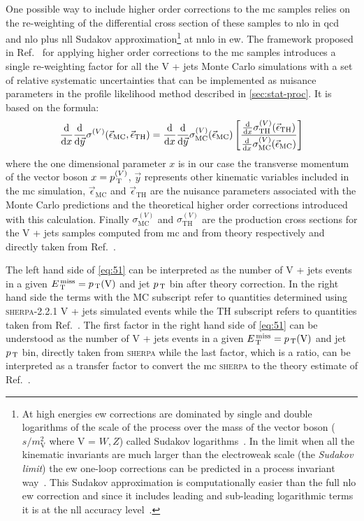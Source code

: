 One possible way to include higher order corrections to the \gls{mc} samples
relies on the re-weighting of the differential cross section of these samples to
\gls{nlo} in \gls{qcd} and \gls{nlo} plus \gls{nll} Sudakov
approximation\footnote{At high energies \gls{ew} corrections are dominated by
  single and double logarithms of the scale of the process over the mass of the
  vector boson ($s/m_\mathrm{V}^2$ where V = $W, Z$) called Sudakov
  logarithms~\cite{SudakovLogs}. In the limit when all the kinematic invariants
  are much larger than the electroweak scale (the \emph{Sudakov limit}) the
  \gls{ew} one-loop corrections can be predicted in a process invariant
  way~\cite{SudakovApproximation}. This Sudakov approximation is computationally
  easier than the full \gls{nlo} \gls{ew} correction and since it includes
  leading and sub-leading logarithmic terms it is at the \gls{nll} accuracy
  level~\cite{SudakovApproximation}.} at \gls{nnlo} in \gls{ew}. The framework
proposed in Ref.~\cite{VplusJetsCorrections} for applying higher order
corrections to the \gls{mc} samples introduces a single re-weighting factor for
all the V + jets Monte Carlo simulations with a set of relative systematic
uncertainties that can be implemented as nuisance parameters in the profile
likelihood method described in \cref{sec:stat-proc}. It is based on the formula:
\begin{equation}
  \label{eq:51}
  \frac{\mathrm{d}}{\mathrm{d} x} \frac{\mathrm{d}}{\mathrm{d} \vec{y}} \sigma^{(V)}
  (\vec{\epsilon}_\mathrm{MC}, \vec{\epsilon}_\mathrm{TH}) = \frac{\mathrm{d}}{\mathrm{d} x}
  \frac{\mathrm{d}}{\mathrm{d} \vec{y}} \sigma_\mathrm{MC}^{(V)}(\vec{\epsilon}_\mathrm{MC})
  \left[ \frac{\frac{\mathrm{d}}{\mathrm{d} x}
      \sigma_\mathrm{TH}^{(V)}(\vec{\epsilon}_\mathrm{TH})}{\frac{\mathrm{d}}{\mathrm{d} x}
      \sigma_\mathrm{MC}^{(V)}(\vec{\epsilon}_\mathrm{MC})} \right]
\end{equation}
where the one dimensional parameter $x$ is in our case the transverse momentum
of the vector boson $x = p_\mathrm{\, T}^{(V)}$, $\vec{y}$ represents other kinematic
variables included in the \gls{mc} simulation, $\vec{\epsilon}_\mathrm{MC}$ and
$\vec{\epsilon}_\mathrm{TH}$ are the nuisance parameters associated with the
Monte Carlo predictions and the theoretical higher order corrections introduced
with this calculation. Finally $\sigma_\mathrm{MC}^{(V)}$ and
$\sigma_\mathrm{TH}^{(V)}$ are the production cross sections for the V + jets
samples computed from \gls{mc} and from theory respectively and directly taken
from Ref.~\cite{VplusJetsCorrections}.

The left hand side of \cref{eq:51} can be interpreted as the number of V + jets
events in a given $E_\mathrm{\, T}^\mathrm{\, miss} = p_\mathrm{\, T}(\mathrm{V})$ and jet $p_\mathrm{\, T}$ bin after theory
correction. In the right hand side the terms with the MC subscript refer to
quantities determined using \textsc{sherpa-2.2.1} V + jets simulated events
while the TH subscript refers to quantities taken from
Ref.~\cite{VplusJetsCorrections}. The first factor in the right hand side of
\cref{eq:51} can be understood as the number of V + jets events in a given
$E_\mathrm{\, T}^\mathrm{\, miss} = p_\mathrm{\, T}(\mathrm{V})$ and jet $p_\mathrm{\, T}$ bin, directly taken from \textsc{sherpa}
while the last factor, which is a ratio, can be interpreted as a transfer factor
to convert the \gls{mc} \textsc{sherpa} to the theory estimate of
Ref.~\cite{VplusJetsCorrections}.

